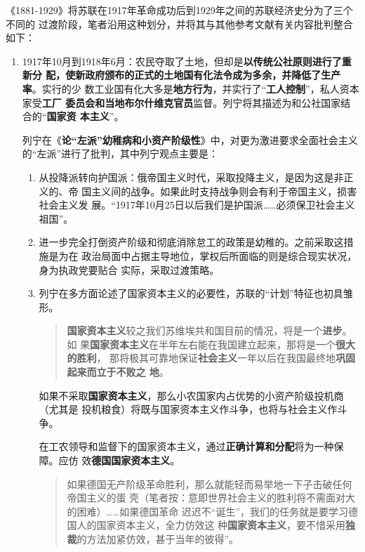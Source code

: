 《1881-1929》将苏联在1917年革命成功后到1929年之间的苏联经济史分为了三个不同的
过渡阶段，笔者沿用这种划分，并将其与其他参考文献有关内容批判整合如下：
\begin{enumerate}
\item 1917年10月到1918年6月：农民夺取了土地，但却是\textbf{以传统公社原则进行了重新分
    配，使新政府颁布的正式的土地国有化法令成为多余，并降低了生产率}。实行的少
  数工业国有化大多是\textbf{地方行为}，并实行了“\textbf{工人控制}”，私人资本家受\textbf{工厂
    委员会和当地布尔什维克官员}监督。列宁将其描述为和公社国家结合的“\textbf{国家资
    本主义}”。

  列宁在《\textbf{论“左派”幼稚病和小资产阶级性}》中，对更为激进要求全面社会主义
  的“左派”进行了批判，其中列宁观点主要是：
  \begin{enumerate}
  \item 从投降派转向护国派：俄帝国主义时代，采取投降主义，是因为这是非正义的、帝
    国主义间的战争。如果此时支持战争则会有利于帝国主义，损害社会主义发
    展。“1917年10月25日以后我们是护国派……必须保卫社会主义祖国”。

  \item 进一步完全打倒资产阶级和彻底消除怠工的政策是幼稚的。之前采取这措施是为在
    政治局面中占据主导地位，掌权后所面临的则是综合现实状况，身为执政党要贴合
    实际，采取过渡策略。

  \item 列宁在多方面论述了国家资本主义的必要性，苏联的“计划”特征也初具雏形。
    \begin{quotation}
      \textbf{国家资本主义}较之我们苏维埃共和国目前的情况，将是一个\textbf{进步}。如
      果\textbf{国家资本主义}在半年左右能在我国建立起来，那将是一个\textbf{很大的胜利}，
      那将极其可靠地保证\textbf{社会主义}一年以后在我国最终地\textbf{巩固起来而立于不败之
        地}。
    \end{quotation}
    如果不采取\textbf{国家资本主义}，那么小农国家内占优势的小资产阶级投机商（尤其是
    投机粮食）将既与国家资本主义作斗争，也将与社会主义作斗争。

    在工农领导和监督下的国家资本主义，通过\textbf{正确计算和分配}将为一种保障。应仿
    效\textbf{德国国家资本主义}。
    \begin{quotation}
      如果德国无产阶级革命胜利，那么就能轻而易举地一下子击破任何帝国主义的蛋
      壳（笔者按：意即世界社会主义的胜利将不需面对大的困难）……如果德国革命
      迟迟不“诞生”，我们的任务就是要学习德国人的国家资本主义，全力仿效这
      种\textbf{国家资本主义}，要不惜采用\textbf{独裁}的方法加紧仿效，甚于当年的彼得”。
    \end{quotation}


\end{enumerate}
\end{enumerate}
